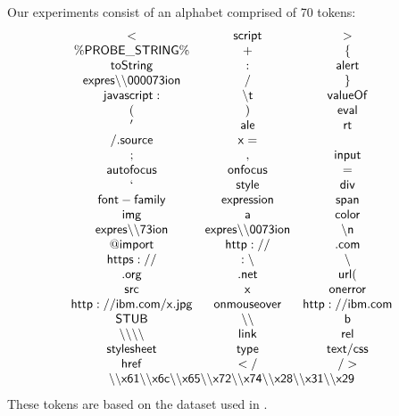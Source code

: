Our experiments consist of an alphabet comprised of 70 tokens:
$$
\begin{array}{ccc}
\sf{<} & \sf{script} & \sf{>} \\
\sf{\%PROBE\_STRING\%}  &   \sf{+} &  \sf{\{}   \\
\sf{toString} & \sf{:} & \sf{alert} \\
\multicolumn{1}{c}{\sf{expres\backslash \backslash 000073ion}} & \sf{/} &  \sf{\}} \\
\sf{javascript:} &  \sf{\backslash t} & \sf{valueOf} \\
\sf{(} & \sf{)} & \sf{eval} \\
\sf{'} & \sf{ale} & \sf{rt} \\
\sf{/.source} & \sf{x=} & \\
\sf{;} & \sf{,} & \sf{input} \\
\sf{autofocus} & \sf{onfocus} & \sf{=} \\
\sf{`} & \sf{style} & \sf{div} \\
\sf{font-family} & \sf{expression} & \sf{span} \\
\sf{img} & \sf{a} & \sf{color} \\
\multicolumn{1}{c}{\sf{expres\backslash \backslash 73ion}} &
\multicolumn{1}{c}{\sf{expres\backslash \backslash 0073ion}} &
 \sf{\backslash n} \\
\sf{@import} & \sf{http://} & \sf{.com} \\
\sf{https://} & \sf{:\backslash } & \sf{\backslash } \\
\sf{.org} & \sf{.net} & \sf{url(} \\
\sf{src} & \sf{x} & \sf{onerror} \\
\sf{http://ibm.com/x.jpg} & \sf{onmouseover} & \sf{http://ibm.com} \\
\sf{STUB} & \sf{\backslash \backslash } & \sf{b} \\
\sf{\backslash \backslash \backslash \backslash } & \sf{link} &  \sf{rel} \\
\sf{stylesheet} & \sf{type} & \sf{text/css} \\
\sf{href} & \sf{</} & \sf{/>} \\
\multicolumn{3}{c}{\sf{\backslash \backslash x61\backslash \backslash x6c\backslash \backslash x65\backslash \backslash x72\backslash \backslash x74\backslash \backslash x28\backslash \backslash x31\backslash \backslash x29}}
\end{array}
$$
These tokens are based on the dataset used in \cite{TrippIssta:2013}.

